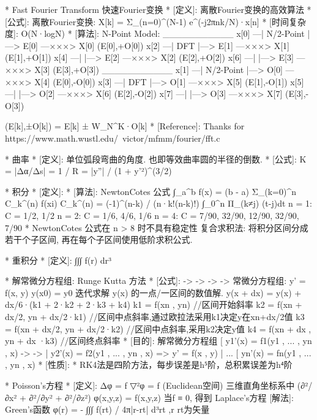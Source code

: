 \documentclass{article}
\begin{document}
*					Fast Fourier Transform 快速Fourier变换
*	[定义]: 离散Fourier变换的高效算法
*	[公式]:
		离散Fourier变换: X[k] = Σ_(n=0)^(N-1)  e^(-j2πnk/N)·x[n]
*	[时间复杂度]: O(N·logN)
*	[算法]:
		N-Point Model:
				___________
		x[0] —| N/2-Point |—> E[0] —×××> X[0]  (E[0],+O[0])
		x[2] —|   DFT	   |—> E[1] —×××> X[1]  (E[1],+O[1])
		x[4] —|		   |—> E[2] —×××> X[2]  (E[2],+O[2])
		x[6] —|		   |—> E[3] —×××> X[3]  (E[3],+O[3])
                ___________
		x[1] —| N/2-Point |—> O[0] —×××> X[4]  (E[0],-O[0])
		x[3] —|   DFT	   |—> O[1] —×××> X[5]  (E[1],-O[1])
		x[5] —|		   |—> O[2] —×××> X[6]  (E[2],-O[2])
		x[7] —|		   |—> O[3] —×××> X[7]  (E[3],-O[3])

		(E[k],±O[k]) = E[k] ± W_N^K·O[k]
*	[Reference]:
		Thanks for https://www.math.wustl.edu/~victor/mfmm/fourier/fft.c


*                    曲率
*	[定义]: 单位弧段弯曲的角度. 也即等效曲率圆的半径的倒数.
*	[公式]: K = |Δα/Δs| = 1 / R = |y''| / (1 + y'²)^(3/2)


    *                    积分
    *	[定义]:
    *	[算法]: NewtonCotes 公式
            ∫_a^b f(x) = (b - a) Σ_(k=0)^n  C_k^(n) f(xi)
            C_k^(n) = (-1)^(n-k) / (n·k!(n-k)!) ∫_0^n Π_(k≠j) (t-j)dt 
            n = 1: C = {1/2, 1/2}
            n = 2: C = {1/6, 4/6, 1/6}
            n = 4: C = {7/90, 32/90, 12/90, 32/90, 7/90}
            * NewtonCotes 公式在 n > 8 时不具有稳定性
            复合求积法: 将积分区间分成若干个子区间, 再在每个子区间使用低阶求积公式.


*                    重积分
*	[定义]: ∫∫∫ f(r) dr³


*                    解常微分方程组: Runge Kutta 方法
*	[公式]:           ->   ->       ->      ->
		常微分方程组: y' = f(x, y)	y(x0) = y0
		迭代求解 \vec y(x) 的一点/一区间的数值解.
		y(x + dx) = y(x) + dx/6·(k1 + 2·k2 + 2·k3 + k4)
		k1 = f(xn , yn)						//区间开始斜率
		k2 = f(xn + dx/2, yn + dx/2·k1)	//区间中点斜率,通过欧拉法采用k1决定y在xn+dx/2值
		k3 = f(xn + dx/2, yn + dx/2·k2)	//区间中点斜率,采用k2决定y值
		k4 = f(xn + dx	, yn + dx  ·k3)	//区间终点斜率
*	[目的]: 解常微分方程组
		[ y1'(x) = f1(y1 , ... , yn , x)          ->   ->
		| y2'(x) = f2(y1 , ... , yn , x)    =>    y' = f(x , y)
		| ...
		[ yn'(x) = fn(y1 , ... , yn , x)
*	[性质]:
		* RK4法是四阶方法，每步误差是h⁵阶，总积累误差为h⁴阶


*                    Poisson's方程
*	[定义]: Δφ = f
			▽²φ = f  (Euclidean空间)
		三维直角坐标系中 (∂²/∂x² + ∂²/∂y² + ∂²/∂z²) φ(x,y,z) = f(x,y,z)
		当f ≡ 0, 得到 Laplace's方程
	[解法]:  Green's函数  φ(r) = - ∫∫∫ f(rt) / 4π|r-rt| d³rt    ,r rt为矢量
\end{document}
